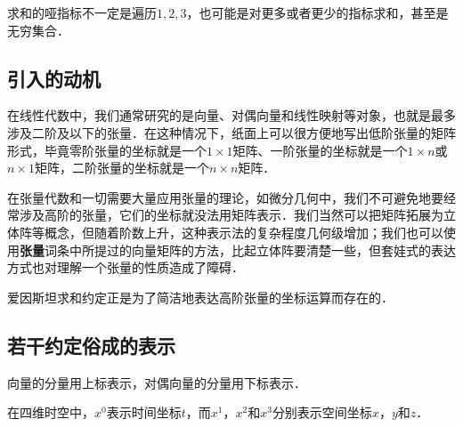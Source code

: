 求和的哑指标不一定是遍历$1, 2, 3$，也可能是对更多或者更少的指标求和，甚至是无穷集合．

\subsection{引入的动机}

在线性代数中，我们通常研究的是向量、对偶向量和线性映射等对象，也就是最多涉及二阶及以下的张量．在这种情况下，纸面上可以很方便地写出低阶张量的矩阵形式，毕竟零阶张量的坐标就是一个$1\times 1$矩阵、一阶张量的坐标就是一个$1\times n$或$n\times 1$矩阵，二阶张量的坐标就是一个$n\times n$矩阵．

在张量代数和一切需要大量应用张量的理论，如微分几何中，我们不可避免地要经常涉及高阶的张量，它们的坐标就没法用矩阵表示．我们当然可以把矩阵拓展为立体阵等概念，但随着阶数上升，这种表示法的复杂程度几何级增加；我们也可以使用\textbf{张量}词条中所提过的向量矩阵的方法，比起立体阵要清楚一些，但套娃式的表达方式也对理解一个张量的性质造成了障碍．

爱因斯坦求和约定正是为了简洁地表达高阶张量的坐标运算而存在的．

\subsection{若干约定俗成的表示}

向量的分量用上标表示，对偶向量的分量用下标表示．

在四维时空中，$x^0$表示时间坐标$t$，而$x^1$，$x^2$和$x^3$分别表示空间坐标$x$，$y$和$z$．




